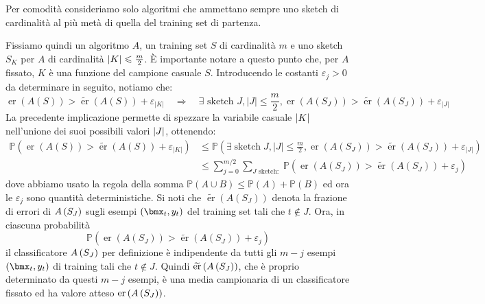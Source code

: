 \documentclass[\main/main.tex]{subfiles}
\begin{document}
\begin{analysis}
    Per comodità consideriamo solo algoritmi che ammettano sempre uno sketch di cardinalità al più metà di quella del training set di partenza.
    
    Fissiamo quindi un algoritmo \(A\), un training set \(S\) di cardinalità \(m\) e uno sketch \(S_K\) per \(A\) di cardinalità \(\left\lvert K\right\rvert \leqslant \frac{m}{2}\). È importante notare a questo punto che, per \(A\) fissato, \(K\) è una funzione del campione casuale \(S\). Introducendo le costanti \(\varepsilon_j >0\) da determinare in seguito, notiamo che:
    \[
        \operatorname{er}(A(S))>\widetilde{\operatorname{er}}(A(S))+\varepsilon_{|K|} \quad \Rightarrow \quad \exists \text { sketch } J,|J| \leq \frac{m}{2}, \operatorname{er}\left(A\left(S_{J}\right)\right)>\widetilde{\operatorname{er}}\left(A\left(S_{J}\right)\right)+\varepsilon_{|J|}
    \]
    La precedente implicazione permette di spezzare la variabile casuale \(\left\lvert K\right\rvert\) nell'unione dei suoi possibili valori \(\left\lvert J\right\rvert\), ottenendo:
    \begin{align*}
        \mathbb{P}\left(\operatorname{er}(A(S))>\widetilde{\operatorname{er}}(A(S))+\varepsilon_{|K|}\right) &\leq \mathbb{P}\left(\exists \operatorname{sketch} J,|J| \leq \frac{m}{2}, \operatorname{er}\left(A\left(S_{J}\right)\right)>\widetilde{\operatorname{er}}\left(A\left(S_{J}\right)\right)+\varepsilon_{|J|}\right)\\
        &\leq \sum_{j=0}^{m / 2} \sum_{J \text { sketch: }} \mathbb{P}\left(\operatorname{er}\left(A\left(S_{J}\right)\right)>\widetilde{\operatorname{er}}\left(A\left(S_{J}\right)\right)+\varepsilon_{j}\right)
    \end{align*}
    dove abbiamo usato la regola della somma \(\mathbb{P}(A \cup B) \leq \mathbb{P}(A)+\mathbb{P}(B)\) ed ora le \(\varepsilon_j\) sono quantità deterministiche. Si noti che \(\widetilde{\operatorname{er}}\left(A\left(S_{J}\right)\right)\) denota la frazione di errori di \(A\left(S_J\right)\) sugli esempi \(\rnd{\bmx_t, y_t}\) del training set tali che \(t \not\in J\). Ora, in ciascuna probabilità
    \[
        \mathbb{P}\left(\operatorname{er}\left(A\left(S_{J}\right)\right)>\widetilde{\operatorname{er}}\left(A\left(S_{J}\right)\right)+\varepsilon_{j}\right)
    \]
    il classificatore \(A\left(S_J\right)\) per definizione è indipendente da tutti gli \(m-j\) esempi \(\rnd{\bmx_t, y_t}\) di training tali che \(t\not\in J\). Quindi \(\widetilde{\text{er}}\left(A\left(S_J\right)\right)\), che è proprio determinato da questi \(m-j\) esempi, è una media campionaria di un classificatore fissato ed ha valore atteso \(\text{er}\left(A\left(S_J\right)\right)\).

\end{analysis}
\end{document}
